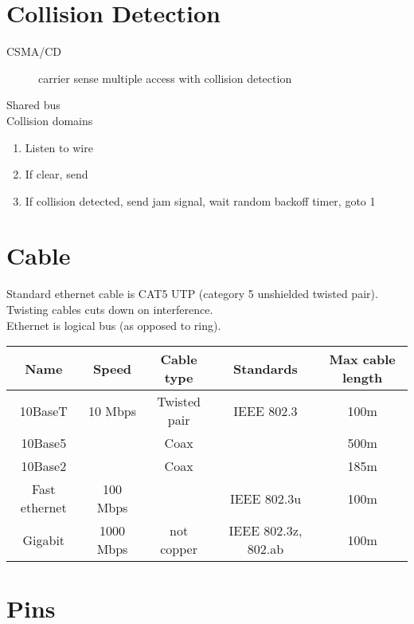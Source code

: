 \documentclass{article}
\begin{document}
\section{Collision Detection}

\begin{description}

\item[CSMA/CD]
carrier sense multiple access with collision detection

\end{description}

Shared bus\\

Collision domains

\begin{enumerate}

\item Listen to wire
\item If clear, send
\item If collision detected, send jam signal, wait random backoff timer, goto 1

\end{enumerate}

\section{Cable}

Standard ethernet cable is CAT5 UTP (category 5 unshielded twisted pair).
Twisting cables cuts down on interference.\\

Ethernet is logical bus (as opposed to ring).\\

\begin{tabular}{ | c | c | c | c | c | }
\hline
Name & Speed & Cable type & Standards & Max cable length \\ \hline
10BaseT & 10 Mbps & Twisted pair & IEEE 802.3 & 100m \\ \hline
10Base5 & & Coax & & 500m \\ \hline
10Base2 & & Coax & & 185m \\ \hline
Fast ethernet & 100 Mbps & & IEEE 802.3u & 100m \\ \hline
Gigabit & 1000 Mbps & not copper & IEEE 802.3z, 802.ab & 100m \\ \hline
\end{tabular}

\section{Pins}
\end{document}
